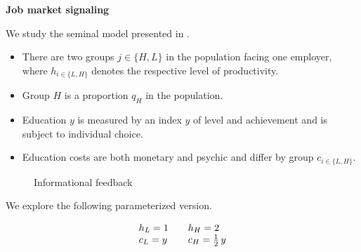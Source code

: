 \begin{frame}\begin{center}
		\LARGE\textbf{Job market signaling}
\end{center}\end{frame}
\begin{frame}

We study the seminal model presented in .
\begin{itemize}\setlength\itemsep{1em}
\item There are two groups $j \in\{H, L\}$ in the population facing one employer, where  $h_{i\in\{L, H\}}$ denotes the respective level of productivity.
\item Group $H$ is a proportion $q_H$ in the population.
\item Education $y$ is measured by an index $y$ of level and achievement and is subject to individual choice.
\item Education costs are both monetary and psychic and differ by group $c_{i\in\{L, H\}}$.
\end{itemize}

\end{frame}
\begin{frame}\begin{figure}[htp]\centering
\caption{Informational feedback}
\end{figure}\end{frame}
\begin{frame}

We explore the following parameterized version.

\begin{align*}\begin{array}{l@{\qquad}l}
	h_L = 1   & h_H = 2 \\
	c_L = y   & c_H = \tfrac{1}{2}\,y \\
\end{array}\end{align*}

\end{frame}
